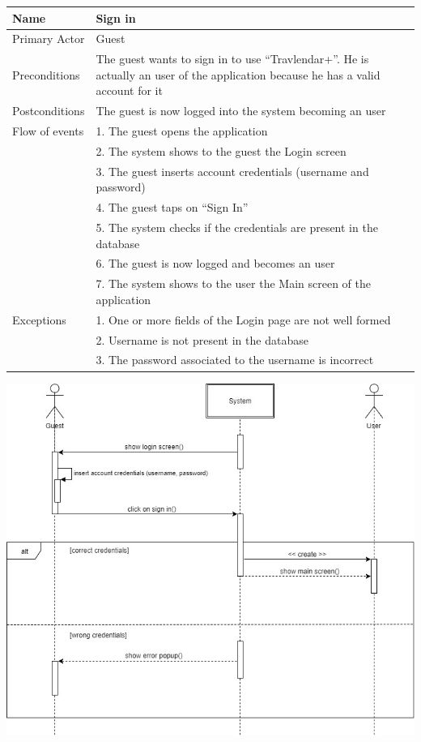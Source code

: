 \begin{center}
\def\arraystretch{1.25}
  \begin{tabular}{ | l | p{} | }
    \hline
    Name & Sign in \\ \hline
    Primary Actor & Guest \\ \hline
    Preconditions & The guest wants to sign in to use “Travlendar+”. He is actually an user of the application because he has a valid account for it \\ \hline
    Postconditions & The guest is now logged into the system becoming an user \\ \hline
    Flow of events  & 1.	The guest opens the application \\
					& 2.	The system shows to the guest the Login screen \\
					& 3.	The guest inserts account credentials (username and password) \\
					& 4.	The guest taps on “Sign In” \\
					& 5.	The system checks if the credentials  are present in the database \\
					& 6.	The guest is now logged and becomes an user \\
					& 7.	The system shows to the user the Main screen of the application \\ \hline    
    Exceptions  & 1.	One or more fields of the Login page are not well formed \\
    			& 2.	Username is not present in the database \\
				& 3.	The password associated to the username is incorrect \\ \hline
  \end{tabular}
\end{center}

\begin{center}
\includegraphics[scale=0.55]{MainMatter/images/sequencediagrams/signin}
\end{center}


